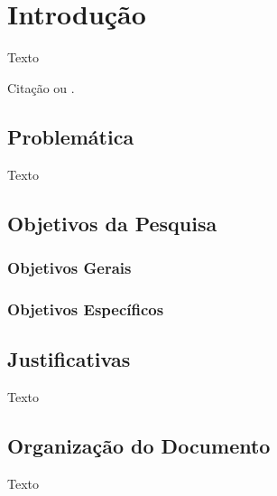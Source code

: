 \chapter{Introdução}

Texto

Citação \cite{Nascimento2014} ou .

\section{Problemática}

Texto

\section{Objetivos da Pesquisa}

\subsection{Objetivos Gerais}

\subsection{Objetivos Específicos}

\section{Justificativas}

Texto

\section{Organização do Documento}

Texto
